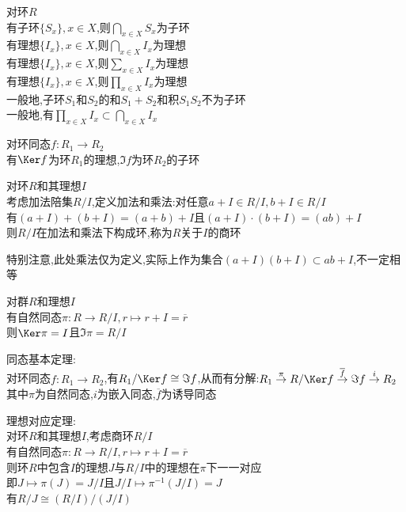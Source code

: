 \begin{tuilun}
对环$R$\\
有子环$\{S_x\},x\in X$,则$\bigcap\limits_{x\in X}S_x$为子环\\
有理想$\{I_x\},x\in X$,则$\bigcap\limits_{x\in X}I_x$为理想\\
有理想$\{I_x\},x\in X$,则$\sum\limits_{x\in X}I_x$为理想\\
有理想$\{I_x\},x\in X$,则$\prod\limits_{x\in X}I_x$为理想\\
一般地,子环$S_1$和$S_2$的和$S_1+S_2$和积$S_1S_2$不为子环\\
一般地,有$\prod\limits_{x\in X}I_x\subset \bigcap\limits_{x\in X}I_x$
\end{tuilun}

\begin{dingli}
对环同态$f:R_1\to R_2$\\
有$\Ker f$为环$R_1$的理想,$\Im f$为环$R_2$的子环
\end{dingli}

\begin{dingyi}
对环$R$和其理想$I$\\
考虑加法陪集$R/I$,定义加法和乘法:对任意$a+I\in R/I,b+I\in R/I$\\
有$(a+I)+(b+I)=(a+b)+I$且$(a+I)\cdot(b+I)=(ab)+I$\\
则$R/I$在加法和乘法下构成环,称为$R$关于$I$的商环
\end{dingyi}

\begin{zhu}
特别注意,此处乘法仅为定义,实际上作为集合$(a+I)(b+I)\subset ab+I$,不一定相等
\end{zhu}

\begin{tuilun}
对群$R$和理想$I$\\
有自然同态$\pi:R\to R/I,r\mapsto r+I=\overline{r}$\\
则$\Ker \pi=I$且$\Im \pi=R/I$
\end{tuilun}

\begin{dingli}
同态基本定理:\\
对环同态$f:R_1\to R_2$,有$R_1/\Ker f\cong \Im f$,从而有分解:$R_1\stackrel{\pi}{\rightarrow}R/\Ker f\stackrel{\overline{f}}{\rightarrow}\Im f\stackrel{i}{\rightarrow}R_2$\\
其中$\pi$为自然同态,$i$为嵌入同态,$\overline{f}$为诱导同态
\end{dingli}

\begin{dingli}
理想对应定理:\\
对环$R$和其理想$I$,考虑商环$R/I$\\
有自然同态$\pi:R\to R/I,r\mapsto r+I=\overline{r}$\\
则环$R$中包含$I$的理想$J$与$R/I$中的理想在$\pi$下一一对应\\
即$J\mapsto \pi(J)=J/I$且$J/I\mapsto \pi^{-1}(J/I)=J$\\
有$R/J\cong(R/I)/(J/I)$
\end{dingli}

